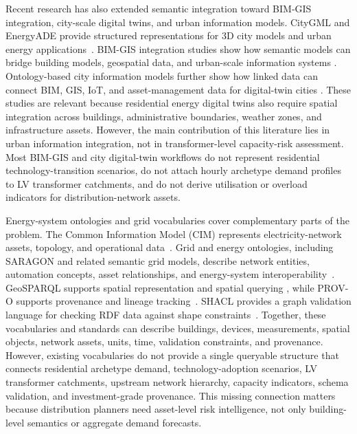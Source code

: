 \documentclass[preprint,12pt]{elsarticle}
\begin{document}
Recent research has also extended semantic integration toward BIM-GIS
integration, city-scale digital twins, and urban information models.
CityGML and EnergyADE provide structured representations for 3D city models
and urban energy applications~\cite{kolbe_citygml_2009,nouvel_energyade_2015}.
BIM-GIS integration studies show how semantic models can bridge building
models, geospatial data, and urban-scale information systems
\cite{deng_bim_gis_2016,liu_review_2017,zhu_bim_gis_2018,shi_ontology-based_2023,
malek_bim_gis_2026}.
Ontology-based city information models further show how linked data can
connect BIM, GIS, IoT, and asset-management data for digital-twin cities
\cite{shi_ontology-based_2023,boje_towards_2020}.
These studies are relevant because residential energy digital twins also
require spatial integration across buildings, administrative boundaries,
weather zones, and infrastructure assets.
However, the main contribution of this literature lies in urban information
integration, not in transformer-level capacity-risk assessment.
Most BIM-GIS and city digital-twin workflows do not represent residential
technology-transition scenarios, do not attach hourly archetype demand
profiles to LV transformer catchments, and do not derive utilisation or
overload indicators for distribution-network assets.

Energy-system ontologies and grid vocabularies cover complementary parts of
the problem.
The Common Information Model (CIM) represents electricity-network assets,
topology, and operational data~\cite{uslar_common_2012}.
Grid and energy ontologies, including SARAGON and related semantic grid
models, describe network entities, automation concepts, asset relationships,
and energy-system interoperability~\cite{tun_sargon2_2025,widergren_smartgrid_2010,
santos_ontology_2017}.
GeoSPARQL supports spatial representation and spatial querying
\cite{perry_geosparql_2012}, while PROV-O supports provenance and lineage
tracking~\cite{lebo_prov-o_2013}.
SHACL provides a graph validation language for checking RDF data against
shape constraints~\cite{knublauch_shacl_2017}.
Together, these vocabularies and standards can describe buildings, devices,
measurements, spatial objects, network assets, units, time, validation
constraints, and provenance.
However, existing vocabularies do not provide a single queryable structure
that connects residential archetype demand, technology-adoption scenarios,
LV transformer catchments, upstream network hierarchy, capacity indicators,
schema validation, and investment-grade provenance.
This missing connection matters because distribution planners need
asset-level risk intelligence, not only building-level semantics or
aggregate demand forecasts.
\end{document}
